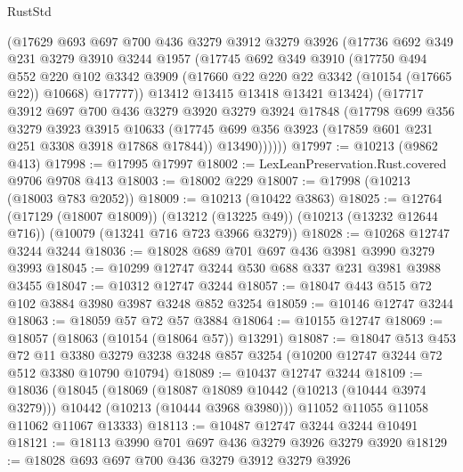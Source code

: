 \begin{lexlean}{RustStd}
\begin{coremodule}
{\begin{coremodule}
{{{{{{{{{{{{{{{{{{{{{{{{{{          (@17629
            @693
            @697
            @700
            @436
            @3279
            @3912
            @3279
            @3926
            (@17736
              @692
              @349
              @231
              @3279
              @3910
              @3244
              @1957
              (@17745
                @692
                @349
                @3910
                (@17750
                  @494
                  @552
                  @220
                  @102
                  @3342
                  @3909
                  (@17660 @22 @220 @22 @3342 (@10154 (@17665 @22)) @10668)
                  @17777))
              @13412
              @13415
              @13418
              @13421
              @13424)
            (@17717
              @3912
              @697
              @700
              @436
              @3279
              @3920
              @3279
              @3924
              @17848
              (@17798
                @699
                @356
                @3279
                @3923
                @3915
                @10633
                (@17745 @699 @356 @3923 (@17859 @601 @231 @251 @3308 @3918 @17868 @17844))
                @13490))))))
@17997 := @10213 (@9862 @413)
@17998 := @17995 @17997
@18002 := LexLeanPreservation.Rust.covered @9706 @9708 @413
@18003 := @18002 @229
@18007 := @17998 (@10213 (@18003 @783 @2052))
@18009 := @10213 (@10422 @3863)
@18025 := @12764
    (@17129 (@18007 @18009))
    (@13212 (@13225 @49))
    (@10213 (@13232 @12644 @716))
    (@10079 (@13241 @716 @723 @3966 @3279))
@18028 := @10268 @12747 @3244 @3244
@18036 := @18028 @689 @701 @697 @436 @3981 @3990 @3279 @3993
@18045 := @10299 @12747 @3244 @530 @688 @337 @231 @3981 @3988 @3455
@18047 := @10312 @12747 @3244
@18057 := @18047 @443 @515 @72 @102 @3884 @3980 @3987 @3248 @852 @3254
@18059 := @10146 @12747 @3244
@18063 := @18059 @57 @72 @57 @3884
@18064 := @10155 @12747
@18069 := @18057 (@18063 (@10154 (@18064 @57)) @13291)
@18087 := @18047
    @513
    @453
    @72
    @11
    @3380
    @3279
    @3238
    @3248
    @857
    @3254
    (@10200 @12747 @3244 @72 @512 @3380 @10790 @10794)
@18089 := @10437 @12747 @3244
@18109 := @18036
    (@18045
      (@18069
        (@18087 @18089 @10442 (@10213 (@10444 @3974 @3279)))
        @10442
        (@10213 (@10444 @3968 @3980)))
      @11052
      @11055
      @11058
      @11062
      @11067
      @13333)
@18113 := @10487 @12747 @3244 @3244 @10491
@18121 := @18113 @3990 @701 @697 @436 @3279 @3926 @3279 @3920
@18129 := @18028 @693 @697 @700 @436 @3279 @3912 @3279 @3926
}}}}}}}}}}}}}}}}}}}}}}}}}}
\end{coremodule}}
\end{coremodule}
\end{lexlean}
